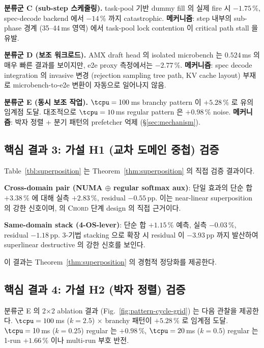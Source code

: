 \textbf{분류군 C (sub-step 스케줄링).}
task-pool 기반 dummy fill 의 실제 fire 시 $-1.75\,\%$, spec-decode backend 에서 $-14$\,\% 까지 catastrophic.
\textbf{메커니즘}: step 내부의 sub-phase 경계 (35--44\,ms 영역) 에서 task-pool lock contention 이 critical path stall 을 유발.

\textbf{분류군 D (보조 워크로드).}
AMX draft head 의 isolated microbench 는 $0.524$\,ms 의 매우 빠른 결과를 보이지만, e2e proxy 측정에서는 $-2.77\,\%$.
\textbf{메커니즘}: spec decode integration 의 invasive 변경 (rejection sampling tree path, KV cache layout) 부재로 microbench-to-e2e 변환이 자동으로 일어나지 않음.

\textbf{분류군 E (동시 보조 작업).}
$\tcpu = 100$\,ms branchy pattern 이 $+5.28\,\%$ 로 유의 임계점 도달.
대조적으로 $\tcpu = 10$\,ms regular pattern 은 $+0.98\,\%$ noise.
\textbf{메커니즘}: 박자 정렬 + 분기 패턴의 prefetcher 억제 (\S\ref{sec:mechanism}).

\subsection{핵심 결과 3: 가설 H1 (교차 도메인 중첩) 검증}



Table~\ref{tbl:superposition} 는 Theorem~\ref{thm:superposition} 의 직접 검증 결과이다.

\textbf{Cross-domain pair (NUMA $\oplus$ regular softmax aux)}: 단일 효과의 단순 합 $+3.38\,\%$ 에 대해 실측 $+2.83\,\%$, residual $-0.55$\,pp.
이는 near-linear superposition 의 강한 신호이며, \algname 의 \textsc{Chord} 단계 design 의 직접 근거이다.

\textbf{Same-domain stack (4-OS-lever)}: 단순 합 $+1.15\,\%$ 예측, 실측 $-0.03\,\%$, residual $-1.18$\,pp.
3-기법 stacking 으로 확장 시 residual 이 $-3.93$\,pp 까지 발산하여 superlinear destructive 의 강한 신호를 보인다.

이 결과는 Theorem~\ref{thm:superposition} 의 경험적 정당화를 제공한다.

\subsection{핵심 결과 4: 가설 H2 (박자 정렬) 검증}

분류군 E 의 2$\times$2 ablation 결과 (Fig.~\ref{fig:pattern-cycle-grid}) 는 다음 관찰을 제공한다.
$\tcpu = 100$\,ms ($k = 2.5$) $\times$ branchy 패턴이 $+5.28\,\%$ 로 임계점 도달.
$\tcpu = 10$\,ms ($k = 0.25$) regular 는 $+0.98\,\%$, $\tcpu = 20$\,ms ($k = 0.5$) regular 는 1-run $+1.66\,\%$ 이나 multi-run 부호 반전.

